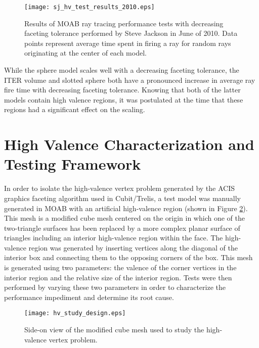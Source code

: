 \begin{figure}[H]
  \centering
  \begin{center}
    \texttt{[image: sj\_hv\_test\_results\_2010.eps]} \\
    \caption{Results of MOAB ray tracing performance tests with decreasing
      faceting tolerance performed by Steve Jackson in June of 2010. Data points
      represent average time spent in firing a ray for random rays
      originating at the center of each model.}
    \label{fig:sj_hv_test_results}
  \end{center}
\end{figure}

While the sphere model scales well with a decreasing faceting tolerance, the
ITER volume and slotted sphere both have a pronounced increase in average ray
fire time with decreasing faceting tolerance. Knowing that both of the latter
models contain high valence regions, it was postulated at the time that these
regions had a significant effect on the scaling.

\section{High Valence Characterization and Testing Framework}

In order to isolate the high-valence vertex problem generated by the ACIS
graphics faceting algorithm used in Cubit/Trelis, a test model was manually
generated in MOAB with an artificial high-valence region (shown in Figure
\ref{fig:hv_cube_design}). This mesh is a modified cube mesh centered on the
origin in which one of the two-triangle surfaces has been replaced by a more
complex planar surface of triangles including an interior high-valence region
within the face. The high-valence region was generated by inserting vertices
along the diagonal of the interior box and connecting them to the opposing
corners of the box. This mesh is generated using two parameters: the valence of
the corner vertices in the interior region and the relative size of the interior
region. Tests were then performed by varying these two parameters in order to
characterize the performance impediment and determine its root cause.

\begin{figure}[H]
  \centering
    \texttt{[image: hv\_study\_design.eps]}
    \caption{Side-on view of the modified cube mesh used to study the
      high-valence vertex problem.}
    \label{fig:hv_cube_design}
\end{figure}

